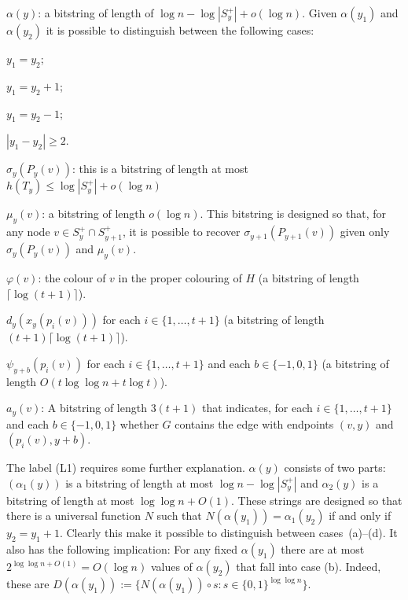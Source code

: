 \documentclass{patmorin}
\begin{document}
\begin{compactenum}[(L1)]
    \item $\alpha(y)$: a bitstring of length of $\log n-\log |S^+_y|+o(\log n)$.  Given $\alpha(y_1)$ and $\alpha(y_2)$ it is possible to distinguish between the following cases:
    \begin{inparaenum}
        \item $y_1=y_2$;
        \item $y_1=y_2+1$;
        \item $y_1=y_2-1$;
        \item $|y_1-y_2|\ge 2$.
    \end{inparaenum}

    \item $\sigma_y(P_y(v))$: this is a bitstring of length at most $h(T_y)\le \log|S^+_y| + o(\log n)$

    \item $\mu_y(v)$: a bitstring of length $o(\log n)$.  This bitstring is designed so that, for any node $v\in S^+_y\cap S^+_{y+1}$, it is possible to recover $\sigma_{y+1}(P_{y+1}(v))$ given only $\sigma_y(P_y(v))$ and $\mu_y(v)$.

    \item $\varphi(v)$: the colour of $v$ in the proper colouring of $H$ (a bitstring of length $\lceil\log(t+1)\rceil$).

    \item $d_y(x_y(p_i(v)))$ for each $i\in\{1,\ldots,t+1\}$ (a bitstring of length $(t+1)\lceil\log(t+1)\rceil$).

    \item $\psi_{y+b}(p_i(v))$ for each $i\in\{1,\ldots,t+1\}$ and each $b\in\{-1,0,1\}$ (a bitstring of length $O(t\log\log n + t\log t)$).\label{psi}

    \item $a_y(v)$: A bitstring of length $3(t+1)$ that indicates, for each $i\in\{1,\ldots,t+1\}$ and each $b\in\{-1,0,1\}$ whether $G$ contains the edge with endpoints $(v,y)$ and $(p_i(v),y+b)$.
\end{compactenum}

The label (L1) requires some further explanation. $\alpha(y)$ consists of two parts: $(\alpha_1(y))$ is a bitstring of length at most $\log n-\log |S^+_y|$ and $\alpha_2(y)$ is a bitstring of length at most $\log\log n+O(1)$.  These strings are designed so that there is a universal function $N$ such that $N(\alpha(y_1))=\alpha_1(y_2)$ if and only if $y_2=y_1+1$.  Clearly this make it possible to distinguish between cases~(a)--(d).  It also has the following implication:  For any fixed $\alpha(y_1)$ there are at most $2^{\log \log n+O(1)}=O(\log n)$ values of $\alpha(y_2)$ that fall into case (b).  Indeed, these are $D(\alpha(y_1)):=\{N(\alpha(y_1))\mathbin{\circ} s: s\in\{0,1\}^{\log\log n}\}$.
\end{document}
